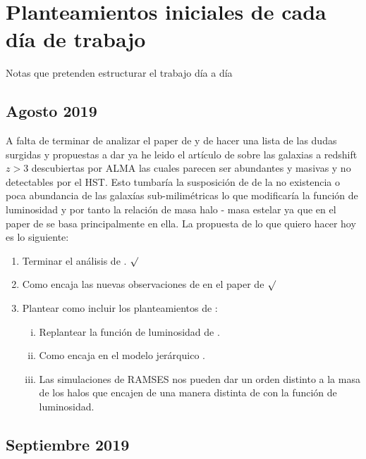 \section*{Planteamientos iniciales de cada día de trabajo}
Notas que pretenden estructurar el trabajo día a día
\subsection*{Agosto 2019}
A falta de terminar de analizar el paper de \cite{finkelstein2015increasing} y de hacer una lista de las dudas surgidas y propuestas a dar ya he leido el artículo de \cite{wang2019dominant} sobre las galaxias a redshift $z>3$ descubiertas por ALMA las cuales parecen ser abundantes y masivas y no detectables por el HST. Esto tumbaría la susposición de \cite{finkelstein2015increasing} de la no existencia o poca abundancia de las galaxías sub-milimétricas lo que modificaría la función de luminosidad y por tanto la relación de masa halo - masa estelar ya que en el paper de \cite{finkelstein2015increasing} se basa principalmente en ella. La propuesta de lo que quiero hacer hoy es lo siguiente:
\begin{enumerate}
\item Terminar el análisis de \cite{finkelstein2015increasing}. $\surd$
\item Como encaja las nuevas observaciones de \cite{wang2019dominant} en el paper de \cite{finkelstein2015increasing} $\surd$
\item Plantear como incluir los planteamientos de \cite{wang2019dominant}: 
\begin{enumerate}[i.]
\item Replantear la función de luminosidad de \cite{finkelstein2015increasing}.
\item Como encaja en el modelo jerárquico \citep{bower2006breaking}.
\item Las simulaciones de RAMSES nos pueden dar un orden distinto a la masa de los halos que encajen de una manera distinta de con la función de luminosidad. 
\end{enumerate}
\end{enumerate}

\subsection*{Septiembre 2019}
